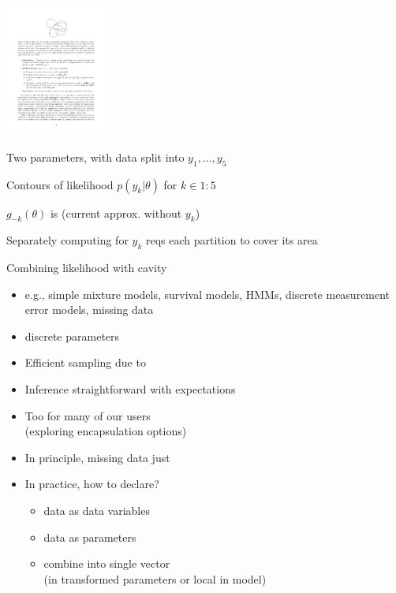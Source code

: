 \documentclass[10pt]{report}
\begin{document}
%
\vspace*{-6pt}
\begin{center}
\includegraphics[width=0.25\textwidth]{img/ep-cavity.pdf}
\end{center}
\vspace*{-8pt}
\begin{subitemize}
\item Two parameters, with data split into $y_1, \ldots, y_5$
\item Contours of likelihood $p(y_k | \theta)$ for $k \in 1{:}5$
\item $g_{-k}(\theta)$ is  (current
  approx. without $y_k$)
\item Separately computing for $y_k$ reqs each partition to cover its area
\item Combining likelihood with cavity 
\end{subitemize}




%
\begin{itemize}
\item e.g., simple mixture models, survival models, HMMs,
  discrete measurement error models, missing data
\item {} discrete parameters
\item Efficient sampling due to 
\item Inference straightforward with expectations
  \vspace*{12pt}
\item Too  for many of our users
  \\
  {\small (exploring encapsulation options)}
\end{itemize}


%
\begin{itemize}
\item In principle, missing data just 
\item In practice, how to declare?
  \begin{itemize}
  \item {} data as data variables
  \item {} data as parameters
  \item combine into single vector
    \\ {\footnotesize (in transformed parameters or local in model)}
  \end{itemize}
\end{itemize}
\end{document}
